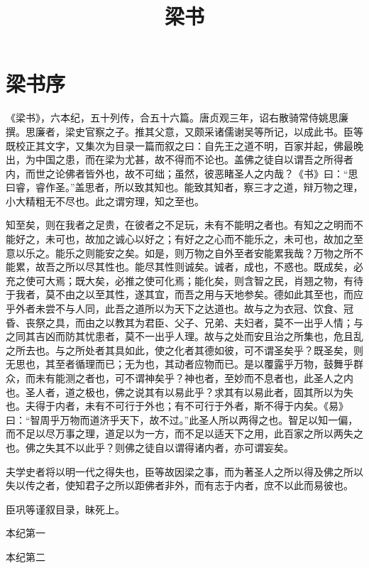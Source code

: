 \documentclass[12pt,UTF8]{ctexbook}
\title{\heiti\zihao{0} 梁书}
\author{}
\date{}
\begin{document}
\maketitle
\tableofcontents

\frontmatter
\chapter{梁书序}

《梁书》，六本纪，五十列传，合五十六篇。唐贞观三年，诏右散骑常侍姚思廉撰。思廉者，梁史官察之子。推其父意，又颇采诸儒谢吴等所记，以成此书。臣等既校正其文字，又集次为目录一篇而叙之曰：自先王之道不明，百家并起，佛最晚出，为中国之患，而在梁为尤甚，故不得而不论也。盖佛之徒自以谓吾之所得者内，而世之论佛者皆外也，故不可绌；虽然，彼恶睹圣人之内哉？《书》曰：“思曰睿，睿作圣。”盖思者，所以致其知也。能致其知者，察三才之道，辩万物之理，小大精粗无不尽也。此之谓穷理，知之至也。

知至矣，则在我者之足贵，在彼者之不足玩，未有不能明之者也。有知之之明而不能好之，未可也，故加之诚心以好之；有好之之心而不能乐之，未可也，故加之至意以乐之。能乐之则能安之矣。如是，则万物之自外至者安能累我哉？万物之所不能累，故吾之所以尽其性也。能尽其性则诚矣。诚者，成也，不惑也。既成矣，必充之使可大焉；既大矣，必推之使可化焉；能化矣，则含智之民，肖翘之物，有待于我者，莫不由之以至其性，遂其宜，而吾之用与天地参矣。德如此其至也，而应乎外者未尝不与人同，此吾之道所以为天下之达道也。故与之为衣冠、饮食、冠昏、丧祭之具，而由之以教其为君臣、父子、兄弟、夫妇者，莫不一出乎人情；与之同其吉凶而防其忧患者，莫不一出乎人理。故与之处而安且治之所集也，危且乱之所去也。与之所处者其具如此，使之化者其德如彼，可不谓圣矣乎？既圣矣，则无思也，其至者循理而已；无为也，其动者应物而已。是以覆露乎万物，鼓舞乎群众，而未有能测之者也，可不谓神矣乎？神也者，至妙而不息者也，此圣人之内也。圣人者，道之极也，佛之说其有以易此乎？求其有以易此者，固其所以为失也。夫得于内者，未有不可行于外也；有不可行于外者，斯不得于内矣。《易》曰：“智周乎万物而道济乎天下，故不过。”此圣人所以两得之也。智足以知一偏，而不足以尽万事之理，道足以为一方，而不足以适天下之用，此百家之所以两失之也。佛之失其不以此乎？则佛之徒自以谓得诸内者，亦可谓妄矣。

夫学史者将以明一代之得失也，臣等故因梁之事，而为著圣人之所以得及佛之所以失以传之者，使知君子之所以距佛者非外，而有志于内者，庶不以此而易彼也。

臣巩等谨叙目录，昧死上。

\mainmatter

本纪第一

本纪第二
\end{document}
